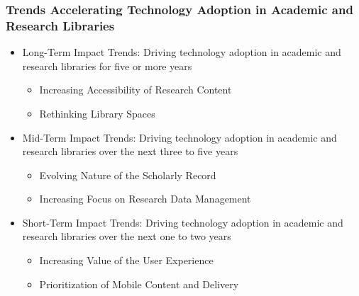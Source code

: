   \begin{frame}
    \frametitle{Trends Accelerating Technology Adoption in Academic and Research Libraries}

    \pause

      \begin{itemize}
        \item Long-Term Impact Trends: Driving technology adoption in academic and research libraries for five or more years
          \begin{itemize}
            \item Increasing Accessibility of Research Content
            \item Rethinking Library Spaces
          \end{itemize}
        \item Mid-Term Impact Trends: Driving technology adoption in academic and research libraries over the next three to five years
          \begin{itemize}
            \item Evolving Nature of the Scholarly Record
            \item Increasing Focus on Research Data Management
          \end{itemize}
        \item Short-Term Impact Trends: Driving technology adoption in academic and research libraries over the next one to two years
          \begin{itemize}
            \item Increasing Value of the User Experience
            \item Prioritization of Mobile Content and Delivery
          \end{itemize}
      \end{itemize}
  \end{frame}
  
